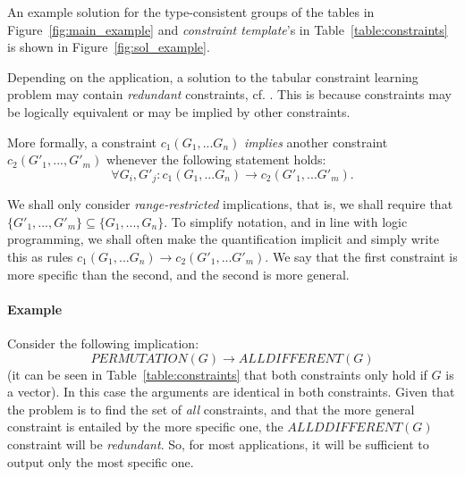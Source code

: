 \documentclass{sig-alternate-05-2015}
\newcommand{\constraints}{\ensuremath{\mathcal{T}}\xspace}
\newcommand{\format}[1]{\textit{#1}\xspace}
\newcommand{\template}{\format{constraint template}}
\newcommand{\groups}{\ensuremath{\mathcal{G}}\xspace}
\newcommand{\ecalldiff}[1]{\ensuremath{\mathit{ALLDIFFERENT}(#1)}}
\newcommand{\ecperm}[1]{\ensuremath{\mathit{PERMUTATION}(#1)}}
\begin{document}

An example solution for the type-consistent groups of the tables in Figure~\ref{fig:main_example} and {\template}'s in Table~\ref{table:constraints} is shown in Figure~\ref{fig:sol_example}.


Depending on the application, a solution to the tabular constraint learning problem may contain \textit{redundant} constraints, cf. \cite{luc_book}. This is because constraints may be logically equivalent or may be implied by other constraints.

More formally, a constraint $c_1(G_1, ... G_n)$ \textit{implies} another constraint~$c_2(G'_1, ..., G'_m)$ whenever
the  following statement holds: $$\forall G_i, G'_j : c_1(G_1, ... G_n) \rightarrow c_2(G'_1, ... G'_m).$$

We shall only consider {\em range-restricted} implications, that is, we shall require that $\{G'_1, ..., G'_m\} \subseteq \{G_1, ..., G_n\}$.
To simplify notation, and in line with logic programming, we shall often make the quantification implicit and simply write this as rules $ c_1(G_1, ... G_n) \rightarrow c_2(G'_1, ... G'_m)$.  We say that the first constraint is more specific than the second, and the second is more general.



\paragraph{Example}
Consider the following implication:
$$\ecperm{G} \rightarrow \ecalldiff{G}$$
(it can be seen in Table~\ref{table:constraints} that both constraints only hold if $G$ is a vector).
In this case the arguments are identical in both constraints.
Given that the problem is to find the set of {\em all} constraints, and that the more general constraint is entailed
by the more specific one, the $ALLDDIFFERENT(G)$ constraint will be {\em redundant}.
So, for most applications, it will be sufficient to output only the most specific one.
\end{document}
